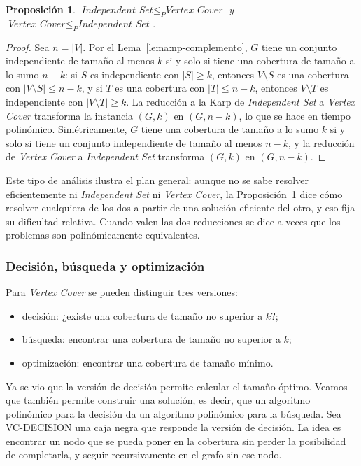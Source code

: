 \documentclass[12pt, spanish, oneside, openany]{book}
\newcommand{\redp}{\le_{P}}
\newcommand{\prob}[1]{\textit{#1}}
\newcommand{\IS}{\prob{Independent Set}\xspace}
\newcommand{\VC}{\prob{Vertex Cover}\xspace}
\newcommand{\alg}[1]{#1}
\theoremstyle{uprightplain}
\newtheorem{proposicion}[teorema]{Proposición}
\theoremstyle{definition}
\theoremstyle{remark}
\theoremstyle{definition}
\begin{document}
\begin{proposicion}
\label{prop:np-is-vc}
$\IS\redp\VC$ y $\VC\redp\IS$.
\end{proposicion}
\begin{proof}
Sea $n=|V|$. Por el Lema~\ref{lema:np-complemento}, $G$ tiene un conjunto independiente de tamaño al menos $k$ si y solo si tiene una cobertura de tamaño a lo sumo $n-k$: si $S$ es independiente con $|S|\ge k$, entonces $V\setminus S$ es una cobertura con $|V\setminus S|\le n-k$, y si $T$ es una cobertura con $|T|\le n-k$, entonces $V\setminus T$ es independiente con $|V\setminus T|\ge k$. La reducción a la Karp de \IS a \VC transforma la instancia $(G,k)$ en $(G,n-k)$, lo que se hace en tiempo polinómico. Simétricamente, $G$ tiene una cobertura de tamaño a lo sumo $k$ si y solo si tiene un conjunto independiente de tamaño al menos $n-k$, y la reducción de \VC a \IS transforma $(G,k)$ en $(G,n-k)$.
\end{proof}

Este tipo de análisis ilustra el plan general: aunque no se sabe resolver eficientemente ni \IS ni \VC, la Proposición~\ref{prop:np-is-vc} dice cómo resolver cualquiera de los dos a partir de una solución eficiente del otro, y eso fija su dificultad relativa. Cuando valen las dos reducciones se dice a veces que los problemas son polinómicamente equivalentes.

\subsubsection{Decisión, búsqueda y optimización}

Para \VC se pueden distinguir tres versiones:
\begin{itemize}
    \item decisión: ¿existe una cobertura de tamaño no superior a $k$?;
    \item búsqueda: encontrar una cobertura de tamaño no superior a $k$;
    \item optimización: encontrar una cobertura de tamaño mínimo.
\end{itemize}
Ya se vio que la versión de decisión permite calcular el tamaño óptimo. Veamos que también permite construir una solución, es decir, que un algoritmo polinómico para la decisión da un algoritmo polinómico para la búsqueda. Sea \alg{VC-DECISION} una caja negra que responde la versión de decisión. La idea es encontrar un nodo que se pueda poner en la cobertura sin perder la posibilidad de completarla, y seguir recursivamente en el grafo sin ese nodo.
\end{document}
